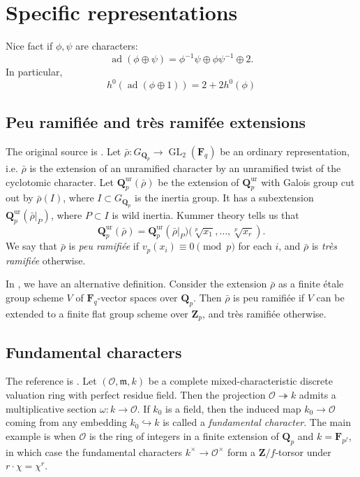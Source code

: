 \documentclass{amsart}
\DeclareMathOperator{\adjoint}{ad}
\DeclareMathOperator{\GL}{GL}
\newcommand{\cO}{\mathcal{O}}
\newcommand{\dF}{\mathbf{F}}
\newcommand{\dQ}{\mathbf{Q}}
\newcommand{\dZ}{\mathbf{Z}}
\newcommand{\fm}{\mathfrak{m}}
\begin{document}
\section{Specific representations}

Nice fact if $\phi,\psi$ are characters: 
\[
  \adjoint(\phi\oplus \psi) = \phi^{-1}\psi\oplus \phi\psi^{-1}\oplus 2 .
\]
In particular, 
\[
  h^0(\adjoint(\phi\oplus 1)) = 2+2 h^0(\phi)
\]


\subsection{Peu ramifi\'ee and tr\`es ramif\'ee extensions}

The original source is \cite[2.4.6]{serre-1987}. 
Let $\bar\rho:G_{\dQ_p}\to \GL_2(\dF_q)$ be 
an ordinary representation, i.e. $\bar\rho$ is the extension of an unramified 
character by an unramified twist of the cyclotomic character. Let 
$\dQ_p^\mathrm{ur}(\bar\rho)$ be the extension of $\dQ_p^\mathrm{ur}$ with 
Galois group cut out by $\bar\rho(I)$, where $I\subset G_{\dQ_p}$ is the 
inertia group. It has a subextension $\dQ_p^\mathrm{ur}(\bar\rho|_P)$, where 
$P\subset I$ is wild inertia. Kummer theory tells us that 
\[
  \dQ_p^\mathrm{ur}(\bar\rho) = \dQ_p^\mathrm{ur}\left(\bar\rho|_P)(\sqrt[p]{x_1},\dots,\sqrt[p]{x_r}\right).
\]
We say that $\bar\rho$ is \emph{peu ramifi\'ee} if $v_p(x_i)\equiv 0\pmod p$ 
for each $i$, and $\bar\rho$ is \emph{tr\`es ramifi\'ee} otherwise. 

In \cite[8.2]{edixhoven-1992}, we have an alternative definition. Consider the 
extension $\bar\rho$ as a finite \'etale group scheme $V$ of $\dF_q$-vector 
spaces over $\dQ_p$. Then $\bar\rho$ is peu ramifi\'ee if $V$ can be extended 
to a finite flat group scheme over $\dZ_p$, and tr\`es ramifi\'ee otherwise. 


\subsection{Fundamental characters}

The reference is \cite[4.4]{tate-1995}.
Let $(\cO,\fm,k)$ be a complete mixed-characteristic discrete valuation ring 
with perfect residue field. Then the projection $\cO\twoheadrightarrow k$ 
admits a multiplicative section $\omega:k\to \cO$. If $k_0$ is a field, then 
the induced map $k_0\to \cO$ coming from any embedding $k_0\hookrightarrow k$ 
is called a \emph{fundamental character}. The main example is when $\cO$ is the 
ring of integers in a finite extension of $\dQ_p$ and 
$k=\dF_{p^f}$, in which case the fundamental characters 
$k^\times\to \cO^\times$ form a $\dZ/f$-torsor under 
$r\cdot \chi = \chi^r$. 
\end{document}
